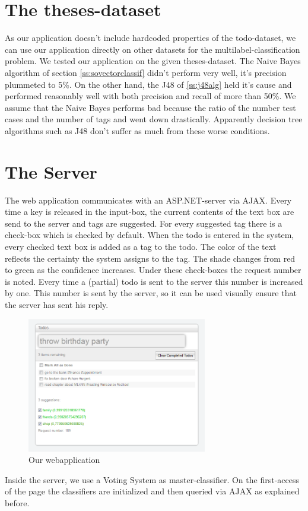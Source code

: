 \documentclass[a4paper,titlepage]{article}
\begin{document}
\section{The theses-dataset}
As our application doesn't include hardcoded properties of the todo-dataset, we can use our application directly on other datasets for the multilabel-classification problem. We tested our application on the given theses-dataset. The Naive Bayes algorithm of section \ref{ss:sovectorclassif} didn't perform very well, it's precision plummeted to 5\%. On the other hand, the J48 of \ref{ss:j48alg} held it's cause and performed reasonably well with both precision and recall of more than 50\%. 
We assume that the Naive Bayes performs bad because the ratio of  the number test cases  and the number of tags and went down drastically. Apparently decision tree algorithms such as J48 don't suffer as much from these worse conditions. 

\section{The Server}
The web application communicates with an ASP.NET-server via AJAX. Every time a key is released in the input-box, the current contents of the text box are send to the server and tags are suggested. For every suggested tag there is a check-box which is checked by default. 
When the todo is entered in the system, every checked text box is added as a tag to the todo. The color of the text reflects the certainty the system assigns to the tag. The shade changes from red to green as the confidence increases. Under these check-boxes the request number is noted. Every time a (partial) todo is sent to the server this number is increased by one. This number is sent by the server, so it can be used visually ensure that the server has sent his reply.
\begin{figure} \centering \includegraphics[width=0.70\textwidth]{screenshot.PNG} \caption{Our webapplication} \end{figure}
Inside the server, we use a Voting System as master-classifier. On the first-access of the page the classifiers are initialized and then queried via AJAX as explained before. 
\end{document}
